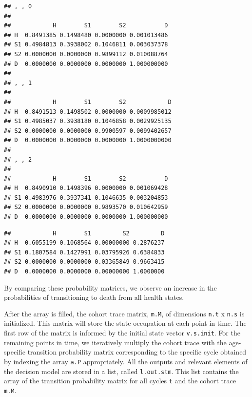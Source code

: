 \documentclass[]{article}
\newenvironment{Shaded}{\begin{snugshade}}{\end{snugshade}}
\newcommand{\CommentTok}[1]{\textcolor[rgb]{0.56,0.35,0.01}{\textit{#1}}}
\newcommand{\OperatorTok}[1]{\textcolor[rgb]{0.81,0.36,0.00}{\textbf{#1}}}
\newcommand{\NormalTok}[1]{#1}
\begin{document}
\begin{verbatim}
## , , 0
## 
##            H        S1        S2           D
## H  0.8491385 0.1498480 0.0000000 0.001013486
## S1 0.4984813 0.3938002 0.1046811 0.003037378
## S2 0.0000000 0.0000000 0.9899112 0.010088764
## D  0.0000000 0.0000000 0.0000000 1.000000000
## 
## , , 1
## 
##            H        S1        S2            D
## H  0.8491513 0.1498502 0.0000000 0.0009985012
## S1 0.4985037 0.3938180 0.1046858 0.0029925135
## S2 0.0000000 0.0000000 0.9900597 0.0099402657
## D  0.0000000 0.0000000 0.0000000 1.0000000000
## 
## , , 2
## 
##            H        S1        S2           D
## H  0.8490910 0.1498396 0.0000000 0.001069428
## S1 0.4983976 0.3937341 0.1046635 0.003204853
## S2 0.0000000 0.0000000 0.9893570 0.010642959
## D  0.0000000 0.0000000 0.0000000 1.000000000
\end{verbatim}

\begin{Shaded}
\end{Shaded}

\begin{verbatim}
##            H        S1         S2         D
## H  0.6055199 0.1068564 0.00000000 0.2876237
## S1 0.1807584 0.1427991 0.03795926 0.6384833
## S2 0.0000000 0.0000000 0.03365849 0.9663415
## D  0.0000000 0.0000000 0.00000000 1.0000000
\end{verbatim}

By comparing these probability matrices, we observe an increase in the
probabilities of transitioning to death from all health states.

After the array is filled, the cohort trace matrix, \texttt{m.M}, of
dimensions \texttt{n.t} x \texttt{n.s} is initialized. This matrix will
store the state occupation at each point in time. The first row of the
matrix is informed by the initial state vector \texttt{v.s.init}. For
the remaining points in time, we iteratively multiply the cohort trace
with the age-specific transition probability matrix corresponding to the
specific cycle obtained by indexing the array \texttt{a.P}
appropriately. All the outputs and relevant elements of the decision
model are stored in a list, called \texttt{l.out.stm}. This list
contains the array of the transition probability matrix for all cycles
\texttt{t} and the cohort trace \texttt{m.M}.
\end{document}

